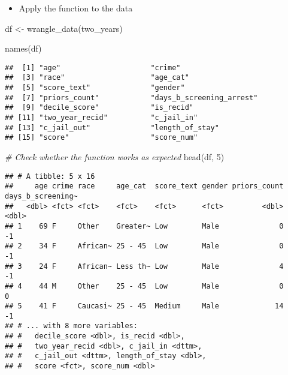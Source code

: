 \documentclass[
]{book}
\newenvironment{Shaded}{\begin{snugshade}}{\end{snugshade}}
\newcommand{\CommentTok}[1]{\textcolor[rgb]{0.56,0.35,0.01}{\textit{#1}}}
\newcommand{\DecValTok}[1]{\textcolor[rgb]{0.00,0.00,0.81}{#1}}
\newcommand{\FunctionTok}[1]{\textcolor[rgb]{0.00,0.00,0.00}{#1}}
\newcommand{\NormalTok}[1]{#1}
\newcommand{\OtherTok}[1]{\textcolor[rgb]{0.56,0.35,0.01}{#1}}
\providecommand{\tightlist}{%
  \setlength{\itemsep}{0pt}\setlength{\parskip}{0pt}}
\begin{document}
\begin{itemize}
\tightlist
\item
  Apply the function to the data
\end{itemize}

\begin{Shaded}
\begin{Highlighting}[]
\NormalTok{df }\OtherTok{\textless{}{-}} \FunctionTok{wrangle\_data}\NormalTok{(two\_years)}

\FunctionTok{names}\NormalTok{(df)}
\end{Highlighting}
\end{Shaded}

\begin{verbatim}
##  [1] "age"                     "crime"                  
##  [3] "race"                    "age_cat"                
##  [5] "score_text"              "gender"                 
##  [7] "priors_count"            "days_b_screening_arrest"
##  [9] "decile_score"            "is_recid"               
## [11] "two_year_recid"          "c_jail_in"              
## [13] "c_jail_out"              "length_of_stay"         
## [15] "score"                   "score_num"
\end{verbatim}

\begin{Shaded}
\begin{Highlighting}[]
\CommentTok{\# Check whether the function works as expected}
\FunctionTok{head}\NormalTok{(df, }\DecValTok{5}\NormalTok{)}
\end{Highlighting}
\end{Shaded}

\begin{verbatim}
## # A tibble: 5 x 16
##     age crime race     age_cat  score_text gender priors_count days_b_screening~
##   <dbl> <fct> <fct>    <fct>    <fct>      <fct>         <dbl>             <dbl>
## 1    69 F     Other    Greater~ Low        Male              0                -1
## 2    34 F     African~ 25 - 45  Low        Male              0                -1
## 3    24 F     African~ Less th~ Low        Male              4                -1
## 4    44 M     Other    25 - 45  Low        Male              0                 0
## 5    41 F     Caucasi~ 25 - 45  Medium     Male             14                -1
## # ... with 8 more variables:
## #   decile_score <dbl>, is_recid <dbl>,
## #   two_year_recid <dbl>, c_jail_in <dttm>,
## #   c_jail_out <dttm>, length_of_stay <dbl>,
## #   score <fct>, score_num <dbl>
\end{verbatim}
\end{document}
